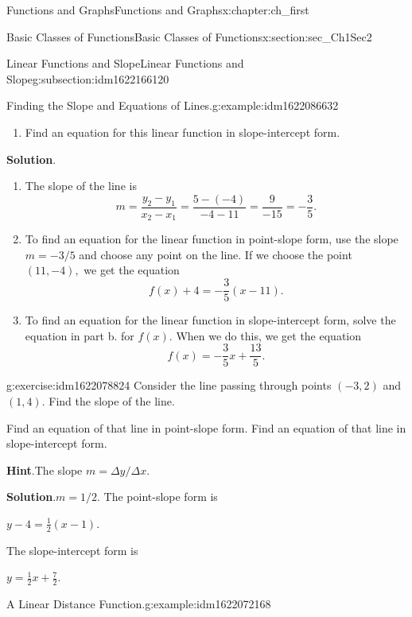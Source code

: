 \documentclass[oneside,10pt,]{book}
\newcommand{\blocktitlefont}{\relax}
\numberwithin{equation}{section}
\begin{document}
\begin{chapterptx}{Functions and Graphs}{}{Functions and Graphs}{}{}{x:chapter:ch_first}
\begin{sectionptx}{Basic Classes of Functions}{}{Basic Classes of Functions}{}{}{x:section:sec_Ch1Sec2}
\begin{subsectionptx}{Linear Functions and Slope}{}{Linear Functions and Slope}{}{}{g:subsection:idm1622166120}
\begin{example}{Finding the Slope and Equations of Lines.}{g:example:idm1622086632}
\begin{enumerate}
\item{}Find an equation for this linear function in slope-intercept form.%
\end{enumerate}
\par\smallskip%
\noindent\textbf{\blocktitlefont Solution}.\hypertarget{g:solution:idm1622082024}{}\quad{}%
\begin{enumerate}
\item{}The slope of the line is%
\begin{equation*}
m=\frac{y_2-y_1}{x_2-x_1}=\frac{ 5 -( -4 )}{-4 - 11}= \frac{ 9 }{-15 }=- \frac{ 3 }{ 5 }.
\end{equation*}
%
\item{}To find an equation for the linear function in point-slope form, use the slope \(m= -3  / 5 \) and choose any point on the line. If we choose the point \(( 11 , -4 ),\) we get the equation%
\begin{equation*}
f(x)+ 4 =- \frac{ 3 }{ 5 }(x- 11 ).
\end{equation*}
%
\item{}To find an equation for the linear function in slope-intercept form, solve the equation in part b. for \(f(x).\) When we do this, we get the equation%
\begin{equation*}
f(x)=- \frac{ 3}{ 5 }x+ \frac{ 13}{ 5 }.
\end{equation*}
%
\end{enumerate}
\end{example}
\begin{inlineexercise}{}{g:exercise:idm1622078824}%
Consider the line passing through points \(( -3 , 2 )\) and \(( 1 , 4 ).\) Find the slope of the line.%
\par
Find an equation of that line in point-slope form. Find an equation of that line in slope-intercept form.%
\par\smallskip%
\noindent\textbf{\blocktitlefont Hint}.\hypertarget{g:hint:idm1622077288}{}\quad{}The slope \(m=\Delta y /\Delta x.\)%
\par\smallskip%
\noindent\textbf{\blocktitlefont Solution}.\hypertarget{g:solution:idm1622074728}{}\quad{}\(m= 1  / 2 .\) The point-slope form is%
\par
\(y- 4 = \frac{ 1}{ 2 }(x- 1 ).\)%
\par
The slope-intercept form is%
\par
\(y= \frac{ 1}{  2 }x+ \frac{ 7 }{ 2 }.\)%
\end{inlineexercise}%
\begin{example}{A Linear Distance Function.}{g:example:idm1622072168}%

\end{example}
\end{subsectionptx}
\end{sectionptx}
\end{chapterptx}
\end{document}
